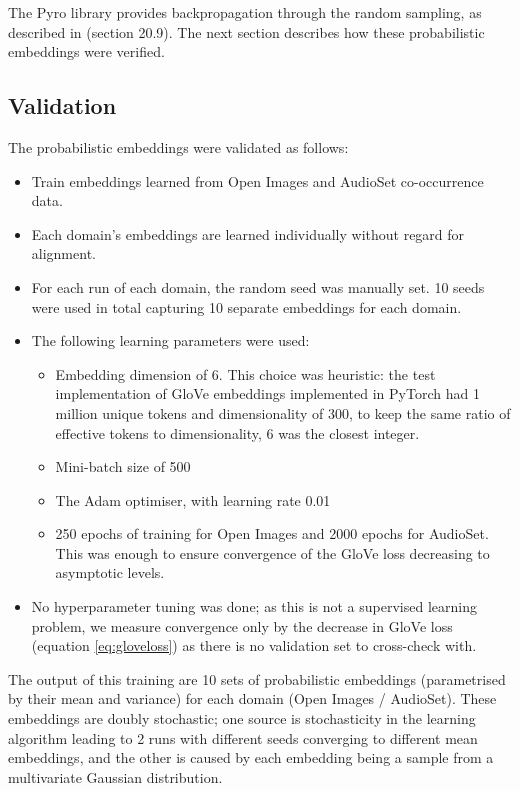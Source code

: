 The Pyro library provides backpropagation through the random sampling, as described in \cite{deeplearninggoodfellow} (section 20.9). The next section describes how these probabilistic embeddings were verified. 

\subsection{Validation}

The probabilistic embeddings were validated as follows:

\begin{itemize}
    \item Train embeddings learned from Open Images and AudioSet co-occurrence data. 
    \item Each domain's embeddings are learned individually without regard for alignment. 
    \item For each run of each domain, the random seed was manually set. 10 seeds were used in total capturing 10 separate embeddings for each domain. 
    \item The following learning parameters were used:
    \begin{itemize}
        \item Embedding dimension of 6. This choice was heuristic: the test implementation of GloVe embeddings implemented in PyTorch had 1 million unique tokens and dimensionality of 300, to keep the same ratio of effective tokens to dimensionality, 6 was the closest integer. 
        \item Mini-batch size of 500
        \item The Adam \cite{kingma2017adam} optimiser, with learning rate 0.01
        \item 250 epochs of training for Open Images and 2000 epochs for AudioSet. This was enough to ensure convergence of the GloVe loss decreasing to asymptotic levels. 
    \end{itemize}
    \item No hyperparameter tuning was done; as this is not a supervised learning problem, we measure convergence only by the decrease in GloVe loss (equation \ref{eq:gloveloss}) as there is no validation set to cross-check with. 
\end{itemize}

The output of this training are 10 sets of probabilistic embeddings (parametrised by their mean and variance) for each domain (Open Images / AudioSet). These embeddings are doubly stochastic; one source is stochasticity in the learning algorithm leading to 2 runs with different seeds converging to different mean embeddings, and the other is caused by each embedding being a sample from a multivariate Gaussian distribution. 

